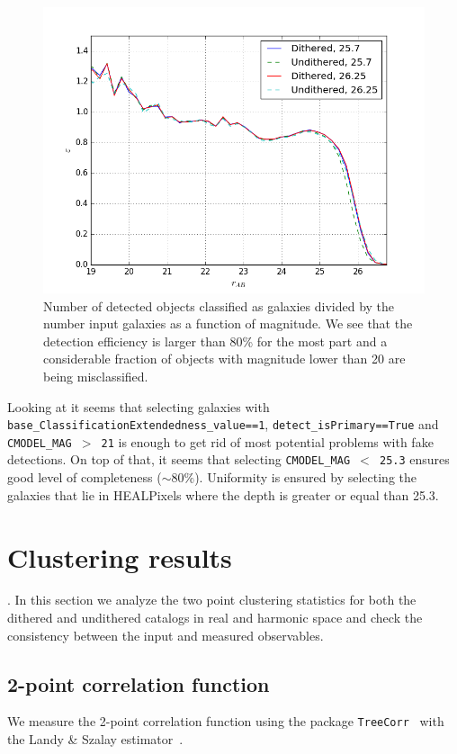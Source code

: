 \documentclass[\docopts]{\docclass}
\begin{document}
\begin{figure}
\centering
\includegraphics[width=0.9\columnwidth]{completeness.png}
\caption{Number of detected objects classified as galaxies divided by the number input galaxies as a function of magnitude. We see that the detection efficiency is larger than 80\% for the most part and a considerable fraction of objects with magnitude lower than 20 are being misclassified.}
\label{fig:completeness}
\end{figure}

Looking at  it seems that selecting galaxies with \texttt{base\_ClassificationExtendedness\_value==1}, \texttt{detect\_isPrimary==True} and \texttt{CMODEL\_MAG $>$ 21} is enough to get rid of most potential problems with fake detections. On top of that, it seems that selecting \texttt{CMODEL\_MAG $<$ 25.3} ensures good level of completeness ($\sim 80\%$). Uniformity is ensured by selecting the galaxies that lie in HEALPixels where the depth is greater or equal than 25.3.

\section{Clustering results}
\label{sec:results}

. In this section we analyze the two point clustering statistics for both the dithered and undithered catalogs in real and harmonic space and check the consistency between the input and measured observables. 

\subsection{2-point correlation function}
We measure the 2-point correlation function using the package \texttt{TreeCorr}~\citep{2004MNRAS.352..338J} with the Landy \& Szalay estimator~\citep{1993ApJ...412...64L}.
\end{document}
